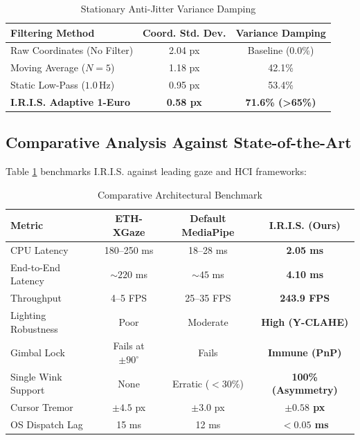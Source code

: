 \documentclass[conference]{IEEEtran}
\begin{document}
\begin{table}[htbp]
\caption{Stationary Anti-Jitter Variance Damping}
\begin{center}
\begin{tabular}{lcc}
\toprule
\textbf{Filtering Method} & \textbf{Coord. Std. Dev.} & \textbf{Variance Damping} \\
\midrule
Raw Coordinates (No Filter) & 2.04 px & Baseline (0.0\%) \\
Moving Average ($N=5$) & 1.18 px & 42.1\% \\
Static Low-Pass ($1.0\,\text{Hz}$) & 0.95 px & 53.4\% \\
\textbf{I.R.I.S. Adaptive 1-Euro} & \textbf{0.58 px} & \textbf{71.6\% (>65\%)} \\
\bottomrule
\end{tabular}
\end{center}
\end{table}

\subsection{Comparative Analysis Against State-of-the-Art}
Table \ref{tab:comparison} benchmarks I.R.I.S. against leading gaze and HCI frameworks:

\begin{table}[htbp]
\caption{Comparative Architectural Benchmark}
\label{tab:comparison}
\begin{center}
\begin{tabular}{lccc}
\toprule
\textbf{Metric} & \textbf{ETH-XGaze} & \textbf{Default MediaPipe} & \textbf{I.R.I.S. (Ours)} \\
\midrule
CPU Latency & 180--250 ms & 18--28 ms & \textbf{2.05 ms} \\
End-to-End Latency & $\sim 220$ ms & $\sim 45$ ms & \textbf{4.10 ms} \\
Throughput & 4--5 FPS & 25--35 FPS & \textbf{243.9 FPS} \\
Lighting Robustness & Poor & Moderate & \textbf{High (Y-CLAHE)} \\
Gimbal Lock & Fails at $\pm 90^\circ$ & Fails & \textbf{Immune (PnP)} \\
Single Wink Support & None & Erratic ($<30\%$) & \textbf{100\% (Asymmetry)} \\
Cursor Tremor & $\pm 4.5$ px & $\pm 3.0$ px & \textbf{$\pm 0.58$ px} \\
OS Dispatch Lag & 15 ms & 12 ms & \textbf{$<0.05$ ms} \\
\bottomrule
\end{tabular}
\end{center}
\end{table}
\end{document}
